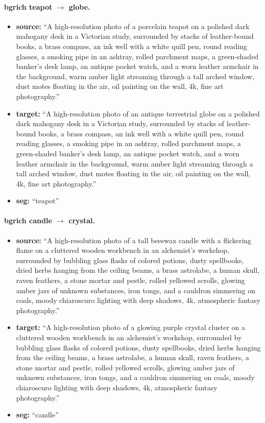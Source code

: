 \paragraph{bgrich teapot $\to$ globe.}
\begin{itemize}
    \item \textbf{source:} ``A high-resolution photo of a porcelain teapot on a polished dark mahogany desk in a Victorian study, surrounded by stacks of leather-bound books, a brass compass, an ink well with a white quill pen, round reading glasses, a smoking pipe in an ashtray, rolled parchment maps, a green-shaded banker's desk lamp, an antique pocket watch, and a worn leather armchair in the background, warm amber light streaming through a tall arched window, dust motes floating in the air, oil painting on the wall, 4k, fine art photography.''
    \item \textbf{target:} ``A high-resolution photo of an antique terrestrial globe on a polished dark mahogany desk in a Victorian study, surrounded by stacks of leather-bound books, a brass compass, an ink well with a white quill pen, round reading glasses, a smoking pipe in an ashtray, rolled parchment maps, a green-shaded banker's desk lamp, an antique pocket watch, and a worn leather armchair in the background, warm amber light streaming through a tall arched window, dust motes floating in the air, oil painting on the wall, 4k, fine art photography.''
    \item \textbf{seg:} ``teapot''
\end{itemize}

\paragraph{bgrich candle $\to$ crystal.}
\begin{itemize}
    \item \textbf{source:} ``A high-resolution photo of a tall beeswax candle with a flickering flame on a cluttered wooden workbench in an alchemist's workshop, surrounded by bubbling glass flasks of colored potions, dusty spellbooks, dried herbs hanging from the ceiling beams, a brass astrolabe, a human skull, raven feathers, a stone mortar and pestle, rolled yellowed scrolls, glowing amber jars of unknown substances, iron tongs, and a cauldron simmering on coals, moody chiaroscuro lighting with deep shadows, 4k, atmospheric fantasy photography.''
    \item \textbf{target:} ``A high-resolution photo of a glowing purple crystal cluster on a cluttered wooden workbench in an alchemist's workshop, surrounded by bubbling glass flasks of colored potions, dusty spellbooks, dried herbs hanging from the ceiling beams, a brass astrolabe, a human skull, raven feathers, a stone mortar and pestle, rolled yellowed scrolls, glowing amber jars of unknown substances, iron tongs, and a cauldron simmering on coals, moody chiaroscuro lighting with deep shadows, 4k, atmospheric fantasy photography.''
    \item \textbf{seg:} ``candle''
\end{itemize}

